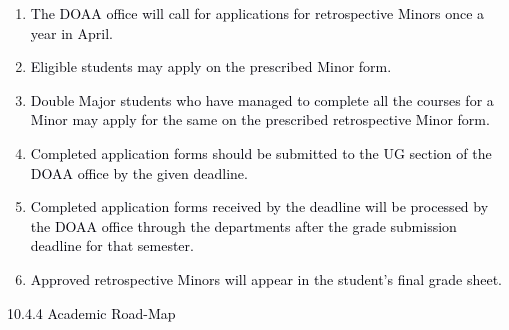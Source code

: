 \documentclass[12pt]{article}
\begin{document}
\vspace{\baselineskip}
\begin{enumerate}
	\item {\fontsize{10pt}{12.0pt}\selectfont \textcolor[HTML]{00000A}{The DOAA office will call for applications for retrospective Minors once a year in April.}\par}\par


\vspace{\baselineskip}
	\item {\fontsize{10pt}{12.0pt}\selectfont \textcolor[HTML]{00000A}{Eligible students may apply on the prescribed Minor form.}\par}\par


\vspace{\baselineskip}
	\item {\fontsize{10pt}{12.0pt}\selectfont \textcolor[HTML]{00000A}{Double Major students who have managed to complete all the courses for a Minor may apply for the same on the prescribed retrospective Minor form.}\par}\par


\vspace{\baselineskip}
	\item {\fontsize{10pt}{12.0pt}\selectfont \textcolor[HTML]{00000A}{Completed application forms should be submitted to the UG section of the DOAA office by the given deadline.}\par}\par


\vspace{\baselineskip}
	\item {\fontsize{10pt}{12.0pt}\selectfont \textcolor[HTML]{00000A}{Completed application forms received by the deadline will be processed by the DOAA office through the departments after the grade submission deadline for that semester.}\par}\par


\vspace{\baselineskip}
	\item {\fontsize{10pt}{12.0pt}\selectfont \textcolor[HTML]{00000A}{Approved retrospective Minors will appear in the student's final grade sheet.}\par}
\end{enumerate}\par


\vspace{\baselineskip}
{\fontsize{10pt}{12.0pt}\selectfont \textcolor[HTML]{00000A}{10.4.4 Academic Road-Map}\par}\par
\end{document}
